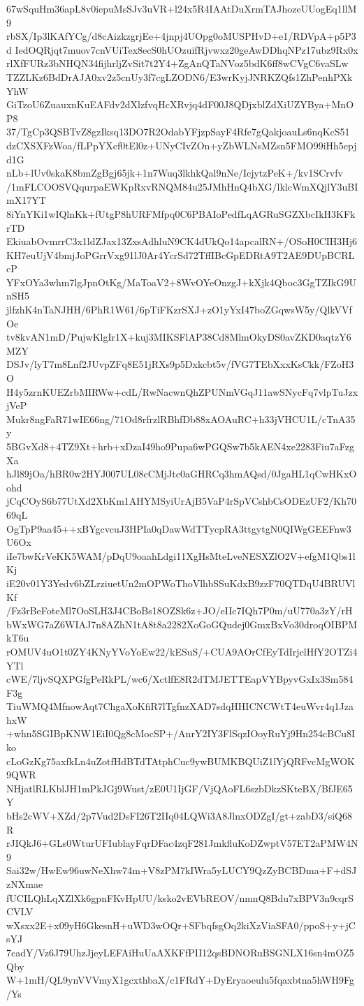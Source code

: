 67wSquHm36apL8v0iepuMsSJv3uVR+l24x5R4IAAtDuXrmTAJhozeUUogEq1llM9
rbSX/Ip3lKAfYCg/d8cAizkzgrjEe+4jnpj4UOpg0oMUSPHvD+e1/RDVpA+p5P3d
IedOQRjqt7muov7cnVUiTex8ecS0hUOzuifRjvwxz20geAwDDhqNPz17ubz9Rx0x
rlXfFURz3bNHQN34fijhrljZvSit7t2Y4+ZgAnQTaNVoz5bdK6ff8wCVgC6vaSLw
TZZLKz6BdDrAJA0xv2z5cnUy3f7cgLZODN6/E3wrKyjJNRKZQfs1ZhPenhPXkYhW
GiTzoU6ZuauxnKuEAFdv2dXlzfvqHcXRvjq4dF00J8QDjxblZdXiUZYBya+MnOP8
37/TgCp3QSBTvZ8gzIksq13DO7R2OdabYFjzpSayF4Rfe7gQakjoauLs6nqKcS51
dzCXSXFzWoa/fLPpYXcf0tEl0z+UNyCIvZOn+yZbWLNsMZsn5FMO99iHh5epjd1G
nLb+lUv0skaK8bmZgBgj65jk+1n7Wuq3lkhkQal9nNe/IcjytzPeK+/kv1SCrvfv
/1mFLCOOSVQqurpaEWKpRxvRNQM84u25JMhHnQ4bXG/lklcWmXQjlY3uBImX17YT
8iYnYKi1wIQlnKk+fUtgP8hURFMfpq0C6PBAIoPedfLqAGRuSGZXbcIkH3KFkrTD
EkiuabOvmrrC3x1ldZJax13ZxsAdhluN9CK4dUkQo14apcalRN+/OSoH0CIH3Hj6
KH7euUjV4bmjJoPGrrVxg91lJ0Ar4YcrSd72TffIBcGpEDRtA9T2AE9DUpBCRLcP
YFxOYa3whm7lgJpnOtKg/MaToaV2+8WvOYeOnzgJ+kXjk4Qboc3GgTZIkG9UnSH5
jlfzhK4nTaNJHH/6PhR1W61/6pTiFKzrSXJ+zO1yYxI47boZGqwsW5y/QlkVVfOe
tv8kvAN1mD/PujwKlgIr1X+kuj3MIKSFlAP38Cd8MlmOkyDS0avZKD0aqtzY6MZY
DSJv/lyT7m8Lnf2JUvpZFq8E51jRXs9p5Dxkcbt5v/fVG7TEbXxxKsCkk/FZoH3O
H4y5zrnKUEZrbMIRWw+cdL/RwNacwnQhZPUNmVGqJ11awSNycFq7vlpTuJzxjVeP
Mukr8ngFaR71wIE66ng/71Od8rfrzlRBhfDb88xAOAuRC+h33jVHCU1L/cTnA35y
5BGvXd8+4TZ9Xt+hrb+xDzaI49ho9Pupa6wPGQSw7b5kAEN4xe2283Fiu7aFzgXa
hJl89jOa/hBR0w2HYJ007UL08cCMjJtc0aGHRCq3hmAQsd/0JgaHL1qCwHKxOohd
jCqCOyS6b77UtXd2XbKm1AHYMSyiUrAjB5VaP4rSpVCshbCsODEzUF2/Kh7069qL
OgTpP9aa45++xBYgcvcuJ3HPIa0qDawWdTTycpRA3ttgytgN0QIWgGEEFnw3U6Ox
iIe7bwKrVeKK5WAM/pDqU9oaahLdgi11XgHsMteLveNESXZlO2V+efgM1Qbs1lKj
iE20v01Y3Yedv6bZLrziuetUn2mOPWoThoVlhbSSuKdxB9zzF70QTDqU4BRUVlKf
/Fz3rBeFoteMl7OoSLH3J4CBoBs18OZSk6z+JO/eIIc7IQh7P0m/uU770a3zY/rH
bWxWG7aZ6WIAJ7n8AZhN1tA8t8a2282XoGoGQudej0GmxBxVo30droqOIBPMkT6u
rOMUV4uO1t0ZY4KNyYVoYoEw22/kESuS/+CUA9AOrCfEyTdIrjclHfY2OTZi4YTl
cWE/7ljvSQXPGfgPeRkPL/wc6/XctlfE8R2dTMJETTEapVYBpyvGxIx3Sm584F3g
TiuWMQ4MfnowAqt7ChgaXoKfiR7lTgfnzXAD7sdqHHICNCWtT4euWvr4q1JzahxW
+whn5SGIBpKNW1EiI0Qg8cMocSP+/AnrY2IY3FlSqzIOoyRuYj9Hn254cBCu8Iko
cLoGzKg75axfkLn4uZotfHdBTdTAtphCuc9ywBUMKBQUiZ1lYjQRFvcMgWOK9QWR
NHjatlRLKblJH1mPkJGj9Wust/zE0U1IjGF/VjQAoFL6szbDkzSKteBX/BfJE65Y
bHs2cWV+XZd/2p7Vud2DsFI26T2IIq04LQWi3A8JlnxODZgI/gt+zabD3/siQ68R
rJIQkJ6+GLs0WturUFIublayFqrDFac4zqF281JmkfluKoDZwptV57ET2aPMW4N9
Sai32w/HwEw96uwNeXhw74m+V8zPM7kIWra5yLUCY9QzZyBCBDma+F+dSJzNXmae
fUCILQhLqXZlXk6gpnFKvHpUU/ksko2vEVbREOV/nmnQ8Bdu7xBPV3n9cqrSCVLV
wXsxx2E+x09yH6GkesnH+uWD3wOQr+SFbqfsgOq2kiXzViaSFA0/ppoS+y+jCsYJ
7cadY/Vz6J79UhzJjeyLEFAiHuUaAXKFfPII12qsBDNORuBSGNLX16sn4mOZ5Qby
W+1mH/QL9ynVVVmyX1gcxthbaX/c1FRdY+DyEryaoeulu5fqaxbtna5hWH9Fg/Ys
